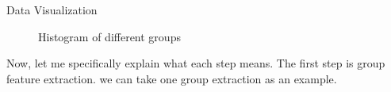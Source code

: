 \documentclass[
 size=14pt,
 paper=smartboard,  %
 mode=present, 		%
 display=slides, 	%
 style=tuliplab,  	%
 pauseslide,
 fleqn,leqno]{powerdot}
\begin{document}
\begin{slide}{Data Visualization}
\begin{figure}[htbp]
{\begin{minipage}[b]{.3\linewidth}
        \end{minipage}
    }
    \caption{Histogram of different groups}
    \end{figure}
  
  \begin{note}
  Now, let me specifically explain what each step means.
  The first step is group feature extraction.
  we can take one group extraction as an example.
  

\end{note}
\end{slide}
\end{document}
